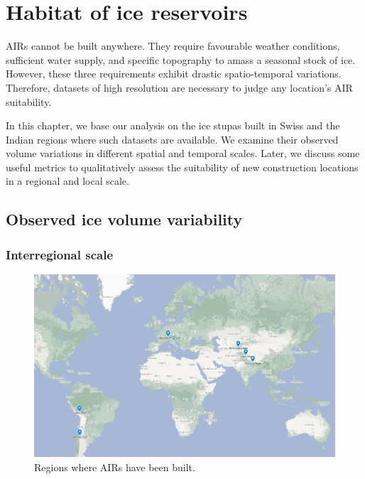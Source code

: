 \chapter{Habitat of ice reservoirs}


AIRs cannot be built anywhere. They require favourable weather conditions, sufficient water supply, and specific
topography to amass a seasonal stock of ice. However, these three requirements exhibit drastic
spatio-temporal variations. Therefore, datasets of high resolution are necessary to judge any location's AIR
suitability. 

In this chapter, we base our analysis on the ice stupas built in Swiss and the Indian regions where such
datasets are available. We examine their observed volume variations in different spatial and temporal scales.
Later, we discuss some useful metrics to qualitatively assess the suitability of new construction locations in a
regional and local scale.

\section{Observed ice volume variability}

\subsection{Interregional scale}

\begin{figure}[htb]
\centering
\includegraphics[width=\textwidth]{figs/AIR_regions2.png}
\caption{Regions where AIRs have been built.}
\label{fig:AIR_regions}
\end{figure}

